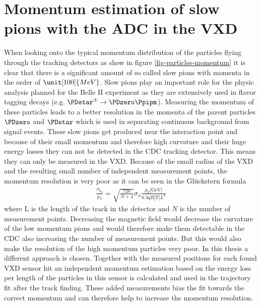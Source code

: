 \newcommand{\dedx}{$\mathrm d E / \mathrm d x$ }
\chapter{Momentum estimation of slow pions with the ADC in the VXD}

When looking onto the typical momentum distribution of the particles flying through the tracking detectors as show in figure \ref{fig-particles-momentum} it is clear that there is a significant amount of so called slow pions with momenta in the order of $\unit[100]{MeV}$. Slow pions play an important role for the physic analysis planned for the Belle II experiment as they are extensively used in flavor tagging decays (e.g. $\PDstar^\pm \to \PDzero \Ppipm$). Measuring the momentum of these particles leads to a better resolution in the momenta of the parent particles $\PDzero$ and $\PDstar$ which is used in separating continuous background from signal events. These slow pions get produced near the interaction point and because of their small momentum and therefore high curvature and their huge energy losses they can not be detected in the CDC tracking detector. This means they can only be measured in the VXD. Because of the small radius of the VXD and the resulting small number of independent measurement points, the momentum resolution is very poor as it can be seen in the Glückstern formula
\begin{align*}
 \frac{\sigma_{p_T}}{p_T} = \sqrt{\frac{720}{N + 4}} \sigma_x \frac{p_T \text{[GeV]}}{0.3 q B \text{[T]} L^2}
\end{align*}
where L is the length of the track in the detector and $N$ is the number of measurement points. Decreasing the magnetic field would decrease the curvature of the low momentum pions and would therefore make them detectable in the CDC also increasing the number of measurement points. But this would also make the resolution of the high momentum particles very poor. In this thesis a different approach is chosen. Together with the measured positions for each found VXD sensor hit an independent momentum estimation based on the energy loss per length of the particles in this sensor is calculated and used in the trajectory fit after the track finding. These added measurements bias the fit towards the correct momentum and can therefore help to increase the momentum resolution.

